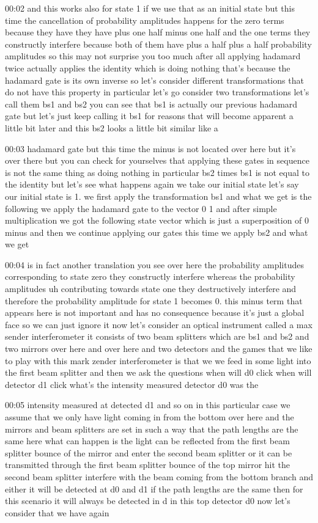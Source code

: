 00:02
and this works also for state 1 if we use that as an initial state but this time
the cancellation of probability amplitudes happens for the zero terms
because they have they have plus one half minus one half
and the one terms they constructly interfere because both of them have
plus a half plus a half probability amplitudes
so this may not surprise you too much after all
applying hadamard twice actually applies the identity
which is doing nothing that's because the hadamard gate is its own inverse
so let's consider different transformations that do not have this property in
particular let's go consider two transformations let's call them bs1
and bs2 you can see that bs1 is actually our previous hadamard gate but let's
just keep calling it bs1 for reasons that will become
apparent a little bit later and this bs2 looks a little bit similar like a

00:03
hadamard gate but this time the minus is not located over here but
it's over there but you can check for yourselves that
applying these gates in sequence is not the same thing as doing nothing
in particular bs2 times bs1 is not equal to the identity
but let's see what happens again we take our initial state
let's say our initial state is 1. we first apply the transformation bs1 and
what we get is the following we apply the hadamard gate to the vector 0 1
and after simple multiplication we got the following state
vector which is just a superposition of 0 minus
and then we continue applying our gates this time we apply bs2 and what we get

00:04
is in fact another translation you see over here the probability amplitudes
corresponding to state zero they constructly interfere
whereas the probability amplitudes uh contributing towards state one
they destructively interfere and therefore the probability amplitude for state 1
becomes 0. this minus term that appears here is not important and has no
consequence because it's just a global face so we can just ignore it
now let's consider an optical instrument called a max sender interferometer
it consists of two beam splitters which are bs1
and bs2 and two mirrors over here and over here and two detectors
and the games that we like to play with this mark zender interferometer is that
we we feed in some light into the first beam splitter
and then we ask the questions when will d0 click when will detector d1 click
what's the intensity measured detector d0 was the

00:05
intensity measured at detected d1 and so on in this particular case
we assume that we only have light coming in from the bottom over here and the
mirrors and beam splitters are set in such a way that the path lengths
are the same here what can happen is the light can be
reflected from the first beam splitter bounce of the mirror and enter the
second beam splitter or it can be transmitted through the first beam splitter
bounce of the top mirror hit the second beam splitter
interfere with the beam coming from the bottom branch
and either it will be detected at d0 and d1
if the path lengths are the same then for this scenario it will always be
detected in d in this top detector d0 now let's consider that we have again

